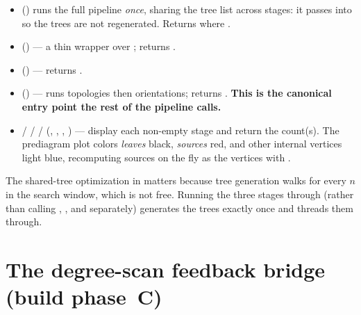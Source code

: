 \begin{itemize}
  \item {} () runs the full
        pipeline \emph{once}, sharing the tree list across stages: it passes
         into  so the
        trees are not regenerated. Returns  where .
  \item {}
        () --- a thin wrapper over
        ; returns .
  \item {}
        () --- returns .
  \item {}
        () --- runs topologies then
        orientations; returns . \textbf{This is the
        canonical entry point the rest of the pipeline calls.}
  \item {} /  /  /
         (,
        , , ) --- display each non-empty stage and
        return the count(s). The prediagram plot colors \emph{leaves} black,
        \emph{sources} red, and other internal vertices light blue, recomputing
        sources on the fly as the vertices with .
\end{itemize}

\begin{note}
The shared-tree optimization in  matters because tree
generation walks  for every $n$ in the search window, which
is not free. Running the three stages through  (rather than
calling , , and
 separately) generates the trees exactly once and
threads them through.
\end{note}

\section{The degree-scan feedback bridge (build phase~C)}
\label{sec:degree-scan}

